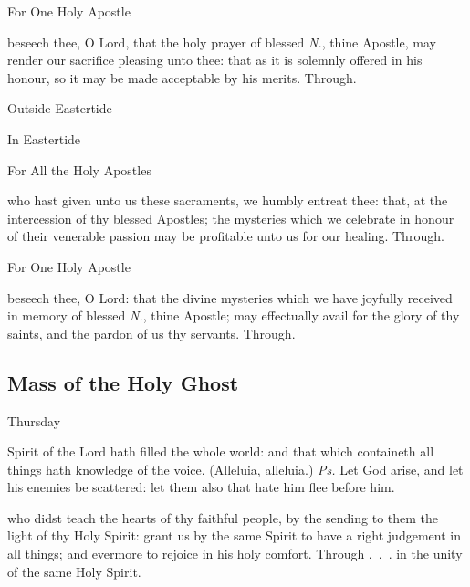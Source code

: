 \begin{inhead}
	For One Holy Apostle
\end{inhead}
 beseech thee, O Lord, that the holy prayer of blessed \textit{N.}, thine Apostle, may render our sacrifice pleasing unto thee: that as it is solemnly offered in his honour, so it may be made acceptable by his merits.  Through.

\begin{inhead}
	Outside Eastertide
\end{inhead}

\begin{inhead}
	In Eastertide
\end{inhead}

\postcommunion
\begin{inhead}
	For All the Holy Apostles
\end{inhead}
 who hast given unto us these sacraments, we humbly entreat thee: that, at the intercession of thy blessed Apostles; the mysteries which we celebrate in honour of their venerable passion may be profitable unto us for our healing. Through.

\begin{inhead}
	For One Holy Apostle
\end{inhead}
 beseech thee, O Lord: that the divine mysteries which we have joyfully received in memory of blessed \textit{N.}, thine Apostle; may effectually avail for the glory of thy saints, and the pardon of us thy servants. Through.


\subsection{Mass of the Holy Ghost}\label{VotiveHolyGhost}
\begin{inhead}
	Thursday
\end{inhead}

\introit
{} Spirit of the Lord hath filled the whole world: and that which containeth all things hath knowledge of the voice.  (Alleluia, alleluia.) \textit{Ps.} Let God arise, and let his enemies be scattered: let them also that hate him flee before him. 

\collect
{} who didst teach the hearts of thy faithful people, by the sending to them the light of thy Holy Spirit: grant us by the same Spirit to have a right judgement in all things; and evermore to rejoice in his holy comfort. Through .~.~. in the unity of the same Holy Spirit.

